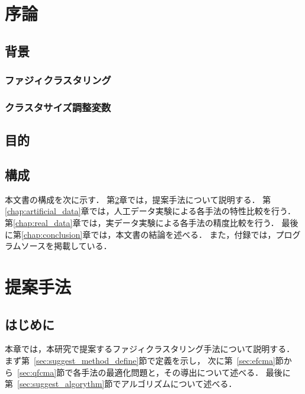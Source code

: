 \documentclass[a4j,12pt,dvipdfmx,oneside]{jsbook}
\theoremstyle{definition}
\begin{document}
\pagestyle{headings}
\def\thepage{\roman{page}}

\tableofcontents
\listoffigures
\listoftables
\newpage
\pagestyle{myheadings}
%
%
%
\chapter{序論}
\def\thepage{\arabic{page}}
\setcounter{page}{1}
\label{chap:first}
%
\section{背景}\label{sec:background}
%


\subsection{ファジィクラスタリング}\label{subsec:fuzzy_clustering}
%
\subsection{クラスタサイズ調整変数}\label{subsec:cluster_adjust_var}
%
\section{目的}\label{sec:purpose}
%
\section{構成}\label{sec:contents}
本文書の構成を次に示す．
第\ref{chap:suggest_method}章では，提案手法について説明する．
第\ref{chap:artificial_data}章では，人工データ実験による各手法の特性比較を行う．
第\ref{chap:real_data}章では，実データ実験による各手法の精度比較を行う．
最後に第\ref{chap:conclusion}章では，本文書の結論を述べる．
また，付録では，プログラムソースを掲載している．
%
%
%
\chapter{提案手法}\label{chap:suggest_method}
%
\section{はじめに}\label{sec:suggest_method_intro}
本章では，本研究で提案するファジィクラスタリング手法について説明する．
まず第~\ref{sec:suggest_method_define}節で定義を示し，
次に第~\ref{sec:efcma}節から~\ref{sec:qfcma}節で各手法の最適化問題と，その導出について述べる．
最後に第~\ref{sec:suggest_algorythm}節でアルゴリズムについて述べる．
%
\end{document}
